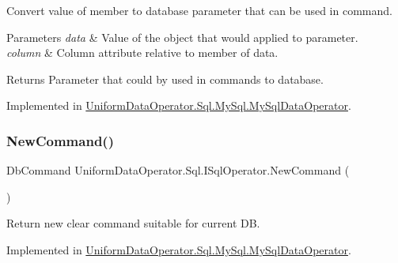 Convert value of member to database parameter that can be used in command. 


\begin{DoxyParams}{Parameters}
{\em data} & Value of the object that would applied to parameter.\\
\hline
{\em column} & Column attribute relative to member of data.\\
\hline
\end{DoxyParams}
\begin{DoxyReturn}{Returns}
Parameter that could by used in commands to database.
\end{DoxyReturn}


Implemented in \mbox{\hyperlink{class_uniform_data_operator_1_1_sql_1_1_my_sql_1_1_my_sql_data_operator_a4f878911e378a4ece16d93f4c3352234}{Uniform\+Data\+Operator.\+Sql.\+My\+Sql.\+My\+Sql\+Data\+Operator}}.

\mbox{\label{interface_uniform_data_operator_1_1_sql_1_1_i_sql_operator_afc0fd8b8c82515c498a6959453f331f1}} 
\subsubsection{\texorpdfstring{New\+Command()}{NewCommand()}\hspace{0.1cm}{\footnotesize\ttfamily [1/2]}}
{\footnotesize\ttfamily Db\+Command Uniform\+Data\+Operator.\+Sql.\+I\+Sql\+Operator.\+New\+Command (\begin{DoxyParamCaption}{ }\end{DoxyParamCaption})}



Return new clear command suitable for current DB. 



Implemented in \mbox{\hyperlink{class_uniform_data_operator_1_1_sql_1_1_my_sql_1_1_my_sql_data_operator_af5850bfb38f7dfcd5acd5157458ef4bd}{Uniform\+Data\+Operator.\+Sql.\+My\+Sql.\+My\+Sql\+Data\+Operator}}.

\mbox{\label{interface_uniform_data_operator_1_1_sql_1_1_i_sql_operator_a10c43a3bfb6e8c88b692488c3341f297}} 
